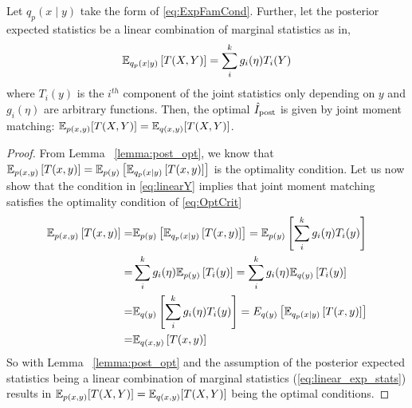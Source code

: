 \renewcommand\thetheorem{4.4}
\begin{lemma}
    Let $q_p(x\mid y)$ take the form of \EQN\eqref{eq:ExpFamCond}. Further,
    let the posterior expected statistics be a linear combination of
    marginal statistics as in,
    \begin{equation}\label{eq:linear_exp_stats}
      \mathbb{E}_{q_p(x\mid y)}\left[T(X,Y)\right]=\sum_i^k g_i(\eta)T_{i}(Y)
    \end{equation}
    where $T_i(y)$ is the $i^{th}$ component of the joint statistics
    only depending on  $y$ and $g_i(\eta)$ are arbitrary functions. 
    Then, the optimal $\hat{I}_{\text{post}}$ is given by joint moment matching:
    $\mathbb{E}_{p(x,y)}[ T(X,Y) ] = \mathbb{E}_{q(x,y)}[ T(X,Y) ]$. 
  \end{lemma}
\begin{proof}
    From Lemma ~\ref{lemma:post_opt}, we know that
    $\mathbb{E}_{p(x,y)}\left[T(x,y)\right]=\mathbb{E}_{p(y)}\left[\mathbb{E}_{q_p(x|y)}\left[T(x,y)\right]\right]$
    is the optimality condition. Let us now show that the condition in
    \EQN\eqref{eq:linearY} implies that joint moment matching satisfies
    the optimality condition of \EQN\eqref{eq:OptCrit}
    \begin{align}
      \mathbb{E}_{p(x,y)}\left[T(x,y)\right]=&\mathbb{E}_{p(y)}\left[\mathbb{E}_{q_p(x|y)}\left[T(x,y)\right]\right]=\mathbb{E}_{p(y)}\left[\sum_i^k g_i(\eta)T_{i}(y)\right]\\
      =&\sum_i^k g_i(\eta)\mathbb{E}_{p(y)}\left[T_{i}(y)\right]=\sum_i^k g_i(\eta)\mathbb{E}_{q(y)}\left[T_{i}(y)\right]\\
      =&\mathbb{E}_{q(y)}\left[\sum_i^k g_i(\eta)T_{i}(y)\right]=E_{q(y)}\left[\mathbb{E}_{q_p(x\mid y)}\left[T(x,y)\right]\right]\\
      =&\mathbb{E}_{q(x,y)}\left[T(x,y)\right]
    \end{align}
So with Lemma ~\ref{lemma:post_opt} and the assumption of the posterior expected 
statistics being a linear combination of marginal statistics (\EQN\eqref{eq:linear_exp_stats}) results in 
$\mathbb{E}_{p(x,y)}[ T(X,Y) ] = \mathbb{E}_{q(x,y)}[ T(X,Y) ]$ being the optimal conditions.
\end{proof}

